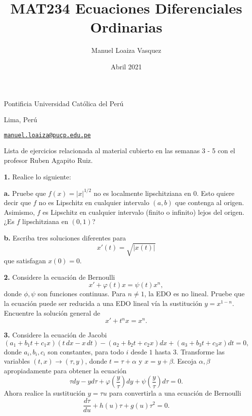\documentclass{article}
\title{MAT234 Ecuaciones Diferenciales Ordinarias}
\author{Manuel Loaiza Vasquez}
\date{Abril 2021}
\newenvironment{statement}[1]{\smallskip\noindent\color[rgb]{1.00,0.00,0.50} {\bf #1.}}{}
\theoremstyle{definition}
\theoremstyle{remark}
\begin{document}
\maketitle

\vspace*{-0.25in}
\centerline{Pontificia Universidad Cat\'olica del Per\'u}
\centerline{Lima, Per\'u}
\centerline{\href{mailto:manuel.loaiza@pucp.edu.pe}{{\tt manuel.loaiza@pucp.edu.pe}}}
\vspace*{0.15in}

\begin{framed}
  Lista de ejercicios relacionada al material cubierto en las semanas 3 - 5 con
  el profesor Ruben Agapito Ruiz.
\end{framed}

\begin{statement}{1}
  Realice lo siguiente:
\end{statement}

\begin{statement}{a}
  Pruebe que $f(x) = |x|^{1 / 2}$ no es localmente lipschitziana en $0$.
  Esto quiere decir que $f$ no es Lipschitz en cualquier intervalo $(a, b)$ que
  contenga al origen.
  Asimismo, $f$ es Lipschitz en cualquier intervalo (finito o infinito) lejos
  del origen.
  ¿Es $f$ lipschitziana en $(0, 1)$?
\end{statement}

\begin{statement}{b}
  Escriba tres soluciones diferentes para
  \[
    x'(t) = \sqrt{|x(t)|}
  \]
  que satisfagan $x(0) = 0$.
\end{statement}

\begin{statement}{2}
  Considere la ecuaci\'on de Bernoulli
  \[
    x' + \varphi(t) x = \psi(t) x^n,
  \]
  donde $\phi, \psi$ son funciones continuas.
  Para $n \neq 1$, la EDO es no lineal.
  Pruebe que la ecuaci\'on puede ser reducida a una EDO lineal v\'ia la
  sustituci\'on $y = x^{1 - n}$. Encuentre la soluci\'on general de
  \[
    x' + t^n x = x^n.  
  \]
\end{statement}

\begin{statement}{3}
  Considere la ecuaci\'on de Jacobi
  \[
    (a_1 + b_1 t + c_1 x) (t \, dx - x \, dt) - (a_2 + b_2 t + c_2 x) dx + (a_3 + b_3 t + c_3 x) dt = 0,  
  \]
  donde $a_i, b_i, c_i$ son constantes, para todo $i$ desde $1$ hasta $3$.
  Transforme las variables $(t, x) \to (\tau, y)$, donde
  $t = \tau + \alpha$ y $x = y + \beta$.
  Escoja $\alpha, \beta$ apropiadamente para obtener la ecuaci\'on
  \[
    \tau dy - y d \tau   + \varphi\left(\frac{y}{\tau}\right) dy +
    \psi\left(\frac{y}{\tau}\right) d\tau = 0.
  \]
  Ahora realice la sustituci\'on $y = \tau u$ para convertirla a una ecuaci\'on
  de Bernoulli
  \[
    \frac{d \tau}{du} + h(u) \tau + g(u) \tau^2 = 0.
  \]
\end{statement}
\end{document}
